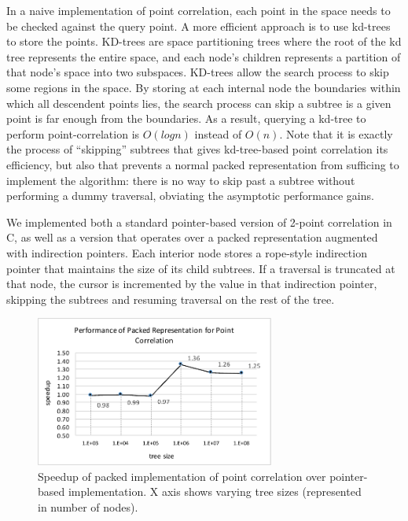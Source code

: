 \documentclass[a4paper,english]{lipics-v2016}
\begin{document}
In a naive implementation of point correlation, each point in the space needs
to be checked against the query point. 
A more efficient approach is to use kd-trees~\cite{bentley75} to store the points. KD-trees are space partitioning trees where the root of the kd tree represents the entire space, and each node's children represents a partition of that node's space into two subspaces.
KD-trees allow the search
process to skip some regions in the space. By storing at each internal node
the boundaries within which all descendent points lies, the search process can
skip a subtree is a given point is far enough from the boundaries. As a
result, querying a kd-tree to perform point-correlation is $O(log n)$ instead
of $O(n)$. Note that it is exactly the process of ``skipping'' subtrees that
gives kd-tree-based point correlation its efficiency, but also that prevents a
normal packed representation from sufficing to implement the algorithm: there
is no way to skip past a subtree without performing a dummy traversal,
obviating the asymptotic performance gains.

We implemented both a standard pointer-based version of 2-point correlation in
C, as well as a version that operates over a packed representation augmented
with indirection pointers. Each interior node stores a rope-style
indirection pointer that maintains the size of its child subtrees. If a
traversal is truncated at that node, the cursor is incremented by the value in
that indirection pointer, skipping the subtrees and resuming traversal on the
rest of the tree.

  
\begin{figure}[htp]
    \centering
    \includegraphics[width=0.7\textwidth]{./figs/pointCorr_perf.pdf}


   \caption{Speedup of packed implementation of point correlation over pointer-based implementation. X axis shows varying tree sizes (represented in number of nodes).}
         \label{fig:pointCorr}
\end{figure}
\end{document}
